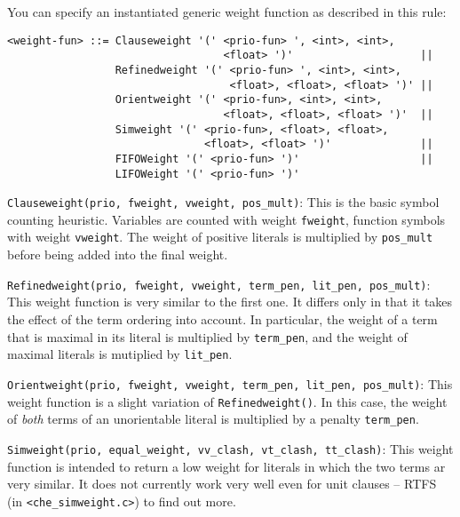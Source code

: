 \documentclass{article}
\begin{document}
You can specify an instantiated generic weight function as described
in this rule:

\small
\begin{verbatim}
<weight-fun> ::= Clauseweight '(' <prio-fun> ', <int>, <int>,
                                  <float> ')'                    ||
                 Refinedweight '(' <prio-fun> ', <int>, <int>,
                                   <float>, <float>, <float> ')' ||
                 Orientweight '(' <prio-fun>, <int>, <int>,       
                                  <float>, <float>, <float> ')'  ||
                 Simweight '(' <prio-fun>, <float>, <float>,        
                               <float>, <float> ')'              ||
                 FIFOWeight '(' <prio-fun> ')'                   ||
                 LIFOWeight '(' <prio-fun> ')'
\end{verbatim}
\normalsize

\medskip
\noindent{}\texttt{Clauseweight(prio, fweight, vweight, pos\_mult)}:
This is the basic symbol counting heuristic. Variables are counted
with weight \texttt{fweight}, function symbols with weight
\texttt{vweight}. The weight of positive literals is multiplied by
\texttt{pos\_mult} before being added into the final weight.

\medskip
\begin{sloppypar}
\noindent{}\texttt{Refinedweight(prio, fweight, vweight,
    term\_pen, lit\_pen, pos\_mult)}: 
This weight function is very similar to the first one. It differs only
in that it takes the effect of the term ordering into account. In
particular, the weight of a term that is maximal in its literal is
multiplied by \texttt{term\_pen}, and the weight of maximal
literals is mutiplied by \texttt{lit\_pen}.
\end{sloppypar}

\medskip
\begin{sloppypar}
\noindent{}\texttt{Orientweight(prio, fweight, vweight,
    term\_pen, lit\_pen, pos\_mult)}: This weight function is a
slight variation of \texttt{Refinedweight()}. In this case, the weight
of \emph{both} terms of an unorientable literal is multiplied by a
penalty \texttt{term\_pen}.
\end{sloppypar}

\medskip
\begin{sloppypar}
\noindent{}\texttt{Simweight(prio, equal\_weight,
  vv\_clash, vt\_clash, tt\_clash)}: This weight function is intended
to return a low weight for literals in which the two terms ar very
similar. It does not currently work very well even for unit clauses --
RTFS (in \texttt{<che\_simweight.c>}) to find out more.
\end{sloppypar}
\end{document}
